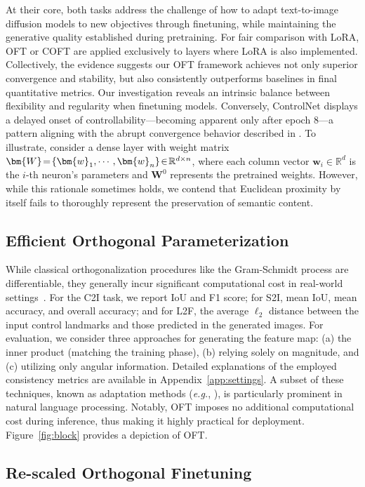 At their core, both tasks address the challenge of how to adapt text-to-image diffusion models to new objectives through finetuning, while maintaining the generative quality established during pretraining. For fair comparison with LoRA, OFT or COFT are applied exclusively to layers where LoRA is also implemented. Collectively, the evidence suggests our OFT framework achieves not only superior convergence and stability, but also consistently outperforms baselines in final quantitative metrics. Our investigation reveals an intrinsic balance between flexibility and regularity when finetuning models. Conversely, ControlNet displays a delayed onset of controllability—becoming apparent only after epoch 8—a pattern aligning with the abrupt convergence behavior described in \cite{zhang2023adding}. To illustrate, consider a dense layer with weight matrix $\thickmuskip=2mu \medmuskip=2mu \bm{W}=\{\bm{w}_1,\cdots,\bm{w}_n\}\in\mathbb{R}^{d\times n}$, where each column vector $\bm{w}_i\in\mathbb{R}^{d}$ is the $i$-th neuron's parameters and $\bm{W}^0$ represents the pretrained weights. However, while this rationale sometimes holds, we contend that Euclidean proximity by itself fails to thoroughly represent the preservation of semantic content. \subsection{Efficient Orthogonal Parameterization}\label{sect:eff_ortho}

While classical orthogonalization procedures like the Gram-Schmidt process are differentiable, they generally incur significant computational cost in real-world settings~\cite{liu2021orthogonal}. For the C2I task, we report IoU and F1 score; for S2I, mean IoU, mean accuracy, and overall accuracy; and for L2F, the average $\ell_2$ distance between the input control landmarks and those predicted in the generated images. For evaluation, we consider three approaches for generating the feature map: (a) the inner product (matching the training phase), (b) relying solely on magnitude, and (c) utilizing only angular information. Detailed explanations of the employed consistency metrics are available in Appendix~\ref{app:settings}. A subset of these techniques, known as adaptation methods (\emph{e.g.}, \cite{hulora2022,houlsby2019parameter,pfeiffer2020adapterfusion}), is particularly prominent in natural language processing. Notably, OFT imposes no additional computational cost during inference, thus making it highly practical for deployment. Figure~\ref{fig:block} provides a depiction of OFT. \subsection{Re-scaled Orthogonal Finetuning}

